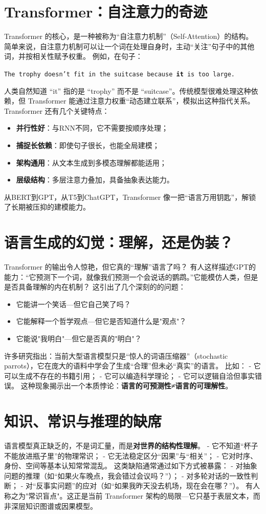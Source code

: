 \section*{Transformer：自注意力的奇迹}
Transformer 的核心，是一种被称为“自注意力机制”（Self-Attention）的结构。
简单来说，自注意力机制可以让一个词在处理自身时，主动“关注”句子中的其他词，并按相关性赋予权重。
例如，在句子：
\begin{center}
\texttt{The trophy doesn't fit in the suitcase because \textbf{it} is too large.}
\end{center}
人类自然知道 “it” 指的是 “trophy” 而不是 “suitcase”。传统模型很难处理这种依赖，但 Transformer 能通过注意力权重“动态建立联系”，模拟出这种指代关系。
Transformer 还有几个关键特点：
\begin{itemize}
\item \textbf{并行性好}：与RNN不同，它不需要按顺序处理；
\item \textbf{捕捉长依赖}：即使句子很长，也能全局建模；
\item \textbf{架构通用}：从文本生成到多模态理解都能适用；
\item \textbf{层级结构}：多层注意力叠加，具备抽象表达能力。
\end{itemize}
从BERT到GPT，从T5到ChatGPT，Transformer 像一把“语言万用钥匙”，解锁了长期被压抑的建模能力。
\section*{语言生成的幻觉：理解，还是伪装？}
Transformer 的输出令人惊艳，但它真的“理解”语言了吗？
有人这样描述GPT的能力：“它预测下一个词，就像我们预测一个会说话的鹦鹉。”它能模仿人类，但是是否具备理解的内在机制？
这引出了几个深刻的的问题：
\begin{itemize}
\item 它能讲一个笑话---但它自己笑了吗？
\item 它能解释一个哲学观点---但它是否知道什么是"观点"？
\item 它能说"我明白"---但它是否真的"明白"？
\end{itemize}
许多研究指出：当前大型语言模型只是“惊人的词语压缩器”（stochastic parrots），它在庞大的语料中学会了生成“合理”但未必“真实”的语言。
比如：
- 它可以生成不存在的书籍引用；
- 它可以编造科学理论；
- 它可以逻辑自洽但事实错误。
这种现象揭示出一个本质悖论：\textbf{语言的可预测性≠语言的可理解性}。
\section*{知识、常识与推理的缺席}
语言模型真正缺乏的，不是词汇量，而是\textbf{对世界的结构性理解}。
- 它不知道“杯子不能放进瓶子里”的物理常识；
- 它无法稳定区分“因果”与“相关”；
- 它对时序、身份、空间等基本认知常常混乱。
这类缺陷通常通过如下方式被暴露：
- 对抽象问题的推理（如“如果火车晚点，我会错过会议吗？”）；
- 对多轮对话的一致性判断；
- 对“反事实问题”的应对（如“如果我昨天没去机场，现在会在哪？”）。
有人称之为"常识盲点"。这正是当前 Transformer 架构的局限---它只基于表层文本，而非深层知识图谱或因果模型。
